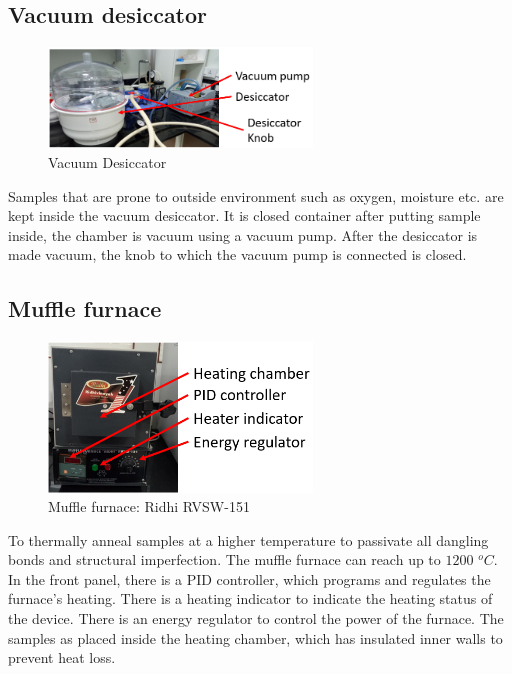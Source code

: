 \documentclass[12pt,a4paper,bold]{thesis}
\theoremstyle{thm}
\theoremstyle{definition}
\begin{document}
\subsection{Vacuum desiccator}
\begin{figure}[H]
	\centering
   \includegraphics[width=7cm]{Images/11.png} 
   \caption{Vacuum Desiccator}
\end{figure}
\indent\indent\indent Samples that are prone to outside environment such as oxygen, moisture etc. are kept inside the vacuum desiccator. It is closed container after putting sample inside, the chamber is vacuum using a vacuum pump. After the desiccator is made vacuum, the knob to which the vacuum pump is connected is closed.

\subsection{Muffle furnace}
\begin{figure}[H]
	\centering
   \includegraphics[width=7cm]{Images/12.png} 
   \caption{Muffle furnace: Ridhi RVSW-151}
\end{figure}
\indent\indent\indent To thermally anneal samples at a higher temperature to passivate all dangling bonds and structural imperfection. The muffle furnace can reach up to $1200$ $^oC$. In the front panel, there is a PID controller, which programs and regulates the furnace's heating. There is a heating indicator to indicate the heating status of the device. There is an energy regulator to control the power of the furnace. The samples as placed inside the heating chamber, which has insulated inner walls to prevent heat loss.  
\end{document}
